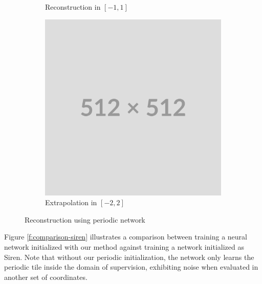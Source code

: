 \begin{figure}
\begin{subfigure}[b]{0.3\textwidth}
        \caption{Reconstruction in $[-1, 1]$}
        \label{fig:three sin x}
    \end{subfigure}
    \hfill
    \begin{subfigure}[b]{0.3\textwidth}
        \centering
        \includegraphics[width=\textwidth]{img/placeholder512.png}
        \caption{Extrapolation in $[-2, 2]$}
        \label{fig:five over x}
    \end{subfigure}
       \caption{Reconstruction using periodic network}
       \label{f:periodic-reconstruction}
\end{figure}

Figure \ref{f:comparison-siren} illustrates a comparison between training a neural network initialized with our method against training a network initialized as Siren. Note that without our periodic initialization, the network only learns the periodic tile inside the domain of supervision, exhibiting noise when evaluated in another set of coordinates.

